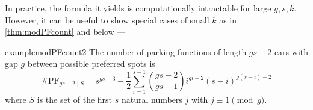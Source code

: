 \documentclass[12 pt]{amsart}
\theoremstyle{definition} %
\theoremstyle{remark} %
\begin{document}
In practice, the formula it yields is computationally intractable for large $g, s, k$. However, it can be useful to show special cases of small $k$ as in \cref{thm:modPFcount} and below ---

\begin{restatable}{example}{modPFcount2}
	The number of parking functions of length $gs - 2$ cars with gap $g$ between possible preferred spots is
	\[
		\#\mathrm{PF}_{gs - 2 \mid S} = s^{gs - 3} - \frac{1}{2} \sum_{i = 1}^{s - 1} \binom{gs - 2}{gs - 1} i^{gi - 2} (s - i)^{g(s - i) - 2}
	\]
	where $S$ is the set of the first $s$ natural numbers $j$ with $j \equiv 1 \pmod g$.
\end{restatable}



\end{document}
